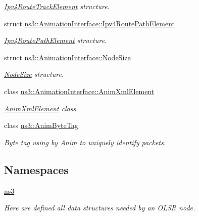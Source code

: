 \begin{DoxyCompactItemize}
\begin{DoxyCompactList}\small\item\em \hyperlink{structns3_1_1AnimationInterface_1_1Ipv4RouteTrackElement}{Ipv4\+Route\+Track\+Element} structure. \end{DoxyCompactList}\item 
struct \hyperlink{structns3_1_1AnimationInterface_1_1Ipv4RoutePathElement}{ns3\+::\+Animation\+Interface\+::\+Ipv4\+Route\+Path\+Element}
\begin{DoxyCompactList}\small\item\em \hyperlink{structns3_1_1AnimationInterface_1_1Ipv4RoutePathElement}{Ipv4\+Route\+Path\+Element} structure. \end{DoxyCompactList}\item 
struct \hyperlink{structns3_1_1AnimationInterface_1_1NodeSize}{ns3\+::\+Animation\+Interface\+::\+Node\+Size}
\begin{DoxyCompactList}\small\item\em \hyperlink{structns3_1_1AnimationInterface_1_1NodeSize}{Node\+Size} structure. \end{DoxyCompactList}\item 
class \hyperlink{classns3_1_1AnimationInterface_1_1AnimXmlElement}{ns3\+::\+Animation\+Interface\+::\+Anim\+Xml\+Element}
\begin{DoxyCompactList}\small\item\em \hyperlink{classns3_1_1AnimationInterface_1_1AnimXmlElement}{Anim\+Xml\+Element} class. \end{DoxyCompactList}\item 
class \hyperlink{classns3_1_1AnimByteTag}{ns3\+::\+Anim\+Byte\+Tag}
\begin{DoxyCompactList}\small\item\em Byte tag using by Anim to uniquely identify packets. \end{DoxyCompactList}\end{DoxyCompactItemize}
\subsection*{Namespaces}
\begin{DoxyCompactItemize}
\item 
 \hyperlink{namespacens3}{ns3}
\begin{DoxyCompactList}\small\item\em Here are defined all data structures needed by an O\+L\+SR node. \end{DoxyCompactList}\end{DoxyCompactItemize}
